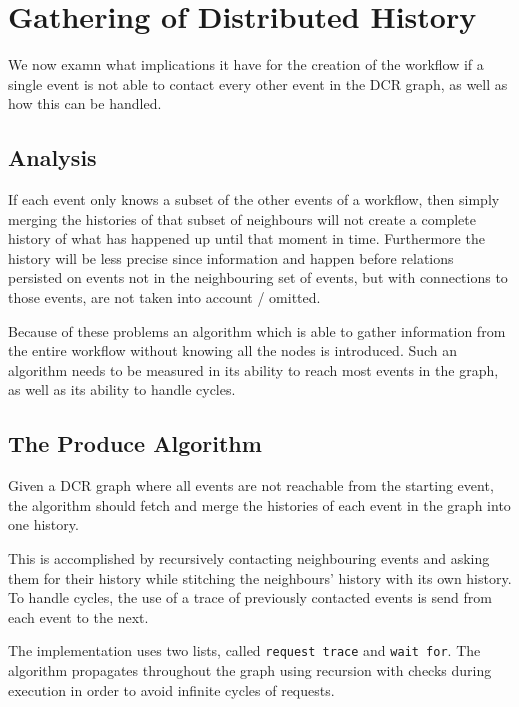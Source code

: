 \chapter{Gathering of Distributed History}
\label{chap:gathering-distributed-history}
	We now examn what implications it have for the creation of the workflow if a single event is not able to contact every other event in the DCR graph, as well as how this can be handled.
	
	\section{Analysis}
	If each event only knows a subset of the other events of a workflow, then simply merging the histories of that subset of neighbours will not create a complete history of what has happened up until that moment in time. Furthermore the history will be less precise since information and happen before relations persisted on events not in the neighbouring set of events, but with connections to those events, are not taken into account / omitted.
	
	Because of these problems an algorithm which is able to gather information from the entire workflow without knowing all the nodes is introduced. Such an algorithm needs to be measured in its ability to reach most events in the graph, as well as its ability to handle cycles. 
	
	\section{The Produce Algorithm}
	Given a DCR graph where all events are not reachable from the starting event, the algorithm should fetch and merge the histories of each event in the graph into one history.
	
	This is accomplished by recursively contacting neighbouring events and asking them for their history while stitching the neighbours' history with its own history. To handle cycles, the use of a trace of previously contacted events is send from each event to the next.
	
	\newpar The implementation uses two lists, called \texttt{request trace} and \texttt{wait for}.
	The algorithm propagates throughout the graph using recursion with checks during execution in order to avoid infinite cycles of requests. 
	
